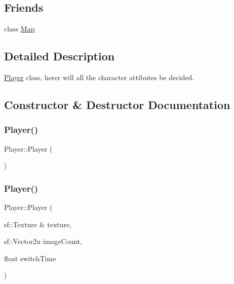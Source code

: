 \subsection*{Friends}
\begin{DoxyCompactItemize}
\item 
class \mbox{\hyperlink{classPlayer_ad2f32e921244459f7cc6d50355429cc6}{Map}}
\end{DoxyCompactItemize}


\subsection{Detailed Description}
\mbox{\hyperlink{classPlayer}{Player}} class, herer will all the character attibutes be decided. 

\subsection{Constructor \& Destructor Documentation}
\mbox{\label{classPlayer_a314e533783ad3c376a43cad3f49efa0c}} 
\subsubsection{\texorpdfstring{Player()}{Player()}\hspace{0.1cm}{\footnotesize\ttfamily [1/2]}}
{\footnotesize\ttfamily Player\+::\+Player (\begin{DoxyParamCaption}{ }\end{DoxyParamCaption})\hspace{0.3cm}{\ttfamily [delete]}}

\mbox{\label{classPlayer_a033e19f2fd9948f3aad73cd82a404f8e}} 
\subsubsection{\texorpdfstring{Player()}{Player()}\hspace{0.1cm}{\footnotesize\ttfamily [2/2]}}
{\footnotesize\ttfamily Player\+::\+Player (\begin{DoxyParamCaption}\item[{sf\+::\+Texture \&}]{texture,  }\item[{sf\+::\+Vector2u}]{image\+Count,  }\item[{float}]{switch\+Time }\end{DoxyParamCaption})}



